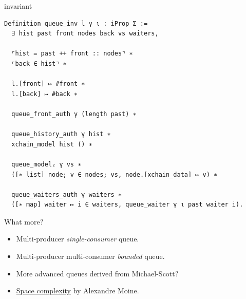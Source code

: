 \begin{frame}[fragile]{\Iris invariant}
\begin{adjustwidth}{-1.5em}{-1.5em}
\small
\begin{verbatim}
Definition queue_inv l γ ι : iProp Σ :=
  ∃ hist past front nodes back vs waiters,
  
  ⌜hist = past ++ front :: nodes⌝ ∗
  ⌜back ∈ hist⌝ ∗
  
  l.[front] ↦ #front ∗
  l.[back] ↦ #back ∗
  
  queue_front_auth γ (length past) ∗
  
  queue_history_auth γ hist ∗
  xchain_model hist () ∗
  
  queue_model₂ γ vs ∗
  ([∗ list] node; v ∈ nodes; vs, node.[xchain_data] ↦ v) ∗
  
  queue_waiters_auth γ waiters ∗
  ([∗ map] waiter ↦ i ∈ waiters, queue_waiter γ ι past waiter i).
\end{verbatim}
\end{adjustwidth}
\end{frame}


\begin{frame}{What more?}
\large
\begin{itemize}
    \item Multi-producer \emph{single-consumer} queue.
    \item Multi-producer multi-consumer \emph{bounded} queue.
    \item More advanced queues derived from Michael-Scott?
    \item \href{https://iris-project.org/workshop-2023/slides/moine.pdf}{Space complexity} by Alexandre Moine.
\end{itemize}
\end{frame}